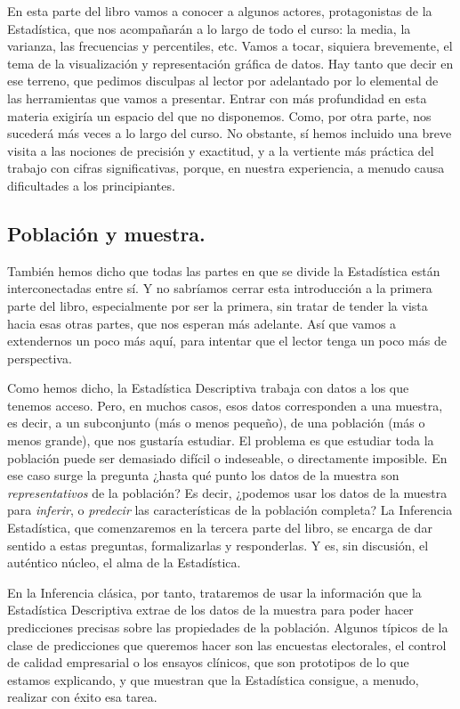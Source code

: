 En esta parte del libro vamos a conocer a algunos actores, protagonistas de la Estadística, que nos
acompañarán a lo largo de todo el curso: la media, la varianza, las frecuencias y percentiles, etc.
Vamos a tocar, siquiera brevemente, el tema de la visualización y representación gráfica de datos.
Hay tanto que decir en ese terreno, que pedimos disculpas al lector por adelantado por lo elemental
de las herramientas que vamos a presentar. Entrar con más profundidad en esta materia exigiría un
espacio del que no disponemos. Como, por  otra parte, nos sucederá más veces a lo largo del curso.
No obstante, sí hemos incluido una breve visita a las nociones de precisión y exactitud, y a la
vertiente más práctica del trabajo con cifras significativas, porque, en nuestra experiencia, a
menudo causa dificultades a los principiantes.

\subsection*{Población y muestra.}

También hemos dicho que todas las partes en que se divide la Estadística están interconectadas
entre sí. Y no sabríamos cerrar esta introducción a la primera parte del libro, especialmente por
ser la primera, sin tratar de tender la vista hacia esas otras partes, que nos esperan más
adelante. Así que vamos a extendernos un poco más aquí, para intentar que el lector tenga un poco
más de perspectiva.

Como hemos dicho, la Estadística Descriptiva trabaja con datos a los que tenemos acceso. Pero, en
muchos casos, esos datos corresponden a una  {\sf muestra}, es decir, a un
subconjunto (más o  menos pequeño), de una  {\sf población} (más o menos grande),
que nos gustaría estudiar. El problema es que estudiar toda la población puede ser demasiado
difícil o indeseable, o directamente imposible. En ese caso surge la pregunta ¿hasta qué punto los
datos de la muestra son {\em representativos} de la población? Es decir, ¿podemos usar los datos de
la muestra para {\em inferir}, o {\em predecir} las características de la población completa? La
 {\sf Inferencia Estadística}, que comenzaremos en la tercera parte del
libro, se encarga de dar sentido a estas preguntas, formalizarlas y responderlas. Y es, sin
discusión, el auténtico núcleo, el alma de la Estadística.

En la Inferencia clásica, por tanto, trataremos de usar la información que la Estadística
Descriptiva extrae de los datos de la muestra para poder hacer predicciones precisas sobre las
propiedades de la población. Algunos típicos de la clase de predicciones que queremos hacer son las encuestas electorales, el control de calidad empresarial o los ensayos clínicos, que son prototipos de lo que estamos explicando, y que muestran que la Estadística consigue, a menudo, realizar con éxito esa tarea.

